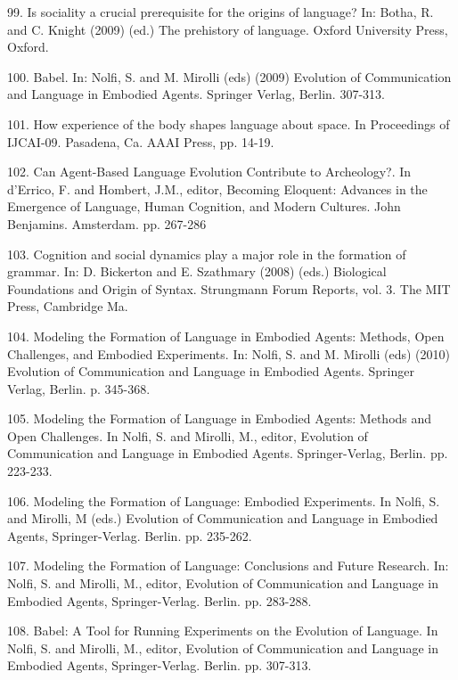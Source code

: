 99. \citet{Steels:09g} Is sociality a crucial prerequisite for the origins of language? In: Botha, R. and C. Knight (2009)
(ed.) The prehistory of language. Oxford University Press, Oxford. 

100. \citet{Steels:09h} Babel. In: Nolfi, S. and M. Mirolli (eds) (2009) Evolution of Communication and Language in Embodied Agents. Springer Verlag, Berlin. 307-313. 

101. \citet{Steels:09i} How experience of the body shapes language about space. In Proceedings of 
IJCAI-09. Pasadena, Ca. AAAI Press, pp. 14-19.  

102. \citet{Steels:09j} Can Agent-Based Language Evolution Contribute to Archeology?. In d'Errico, F. and Hombert, J.M., editor, Becoming Eloquent: Advances in the Emergence of Language, Human Cognition, and Modern Cultures. John Benjamins. Amsterdam. pp. 267-286

103. \citet{Steels:09k} Cognition and social dynamics play a major role in the formation of grammar. In: D. Bickerton and E. Szathmary (2008) (eds.) Biological Foundations and Origin of Syntax. Strungmann Forum Reports, vol. 3. The MIT Press, Cambridge Ma. 

104. \citet{Steels:10a} Modeling the Formation of Language in Embodied Agents: Methods, Open Challenges, and Embodied Experiments. In: Nolfi, S. and M. Mirolli (eds) (2010) Evolution of Communication and Language in Embodied Agents. Springer Verlag, Berlin. p. 345-368. 

105. \citet{Steels:10b} Modeling the Formation of Language in Embodied Agents: Methods and Open Challenges. In Nolfi, S. and Mirolli, M., editor, Evolution of Communication and Language in Embodied Agents. Springer-Verlag, Berlin. pp. 223-233. 

106. \citet{Steels:10c} Modeling the Formation of Language: Embodied Experiments. In Nolfi, S. and Mirolli, M (eds.) Evolution of Communication and Language in Embodied Agents, Springer-Verlag. Berlin. pp. 235-262. 

107. \citet{Steels:10d} Modeling the Formation of Language: Conclusions and Future Research. In: Nolfi, S. and Mirolli, M., editor, Evolution of Communication and Language in Embodied Agents, Springer-Verlag. Berlin. pp. 283-288. 

108. \citet{Steels:10e} Babel: A Tool for Running Experiments on the Evolution of Language. In Nolfi, S. and Mirolli, M., editor, Evolution of Communication and Language in Embodied Agents, Springer-Verlag. Berlin. pp. 307-313.

